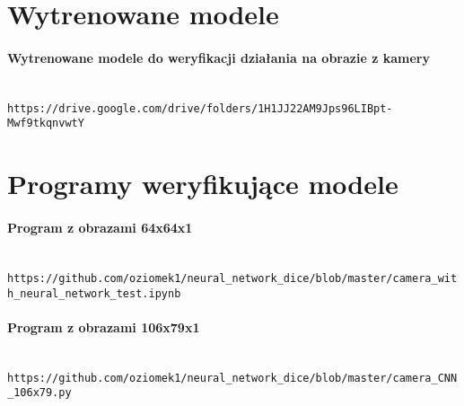 \section{Wytrenowane modele}

\paragraph{Wytrenowane modele do weryfikacji działania na obrazie z kamery} \mbox{}\\
\texttt{https://drive.google.com/drive/folders/1H1JJ22AM9Jps96LIBpt-Mwf9tkqnvwtY}

\section{Programy weryfikujące modele}

\paragraph{Program z obrazami 64x64x1} \mbox{}\\
\texttt{https://github.com/oziomek1/neural_network_dice/blob/master/camera_with_neural_network_test.ipynb}

\paragraph{Program z obrazami 106x79x1} \mbox{}\\
\texttt{https://github.com/oziomek1/neural_network_dice/blob/master/camera_CNN_106x79.py}
